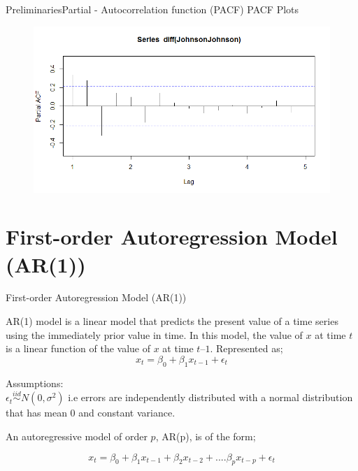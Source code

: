 \documentclass{beamer}
\begin{document}
\begin{frame}{Preliminaries}{Partial - Autocorrelation function (PACF)}
PACF Plots	

\begin{figure}
\centering
\includegraphics[width=0.8\linewidth]{pacf_jj}
\end{figure}

	
\end{frame}	

\section{First-order Autoregression Model (AR(1))}
\begin{frame}{First-order Autoregression Model (AR(1))} 	

AR(1) model is a linear model that predicts the present value of a time series using the immediately prior value in time.   In this model, the value of $ x $ at time $ t $ is a linear function of the value of $ x $ at time $ t–1 $.  Represented as; \\
\begin{equation*}  
x_{t}=\beta_{0}+\beta_{1}x_{t-1}+\epsilon_{t}  
\end{equation*}
	
\pause	
Assumptions:\\

$ \epsilon_t \overset{iid}{\sim} N(0, \sigma^2) $ i.e errors are independently distributed with a normal distribution that has mean 0 and constant variance.
	
An autoregressive model of order $ p $, AR(p), is of the form;  

\begin{equation}  
x_{t}=\beta_{0}+\beta_{1}x_{t-1}+\beta_{2}x_{t-2}+ .... \beta_{p}x_{t-p}+ \epsilon_{t}  
\end{equation}	
	
\end{frame}
\end{document}
